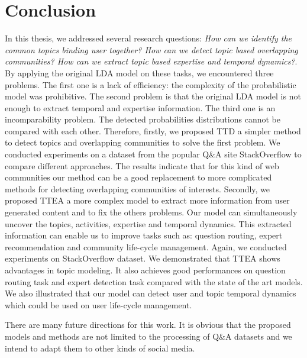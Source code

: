 \chapter{Conclusion}
\doublespacing
\label{chap:intro}
\minitoc



In this thesis, we addressed several research questions: \textit{How can we identify the common topics binding user together? How can we detect topic based overlapping communities? How can we extract topic based expertise and temporal dynamics?}. By applying the original  LDA model on these tasks, we encountered three problems. The first one is a lack of efficiency: the complexity of the probabilistic model was prohibitive. The second problem is that the original LDA model is not enough to extract temporal and expertise information. The third one is an incomparability problem. The detected probabilities distributions cannot be compared with each other. 
Therefore, firstly, we proposed TTD a simpler method to detect topics and overlapping communities to solve the first problem. We conducted experiments on a dataset from the popular Q\&A site StackOverflow to compare different approaches. The results indicate that for this kind of web communities our method can be a good replacement to more complicated methods for detecting overlapping communities of interests.
Secondly, we proposed TTEA a more complex model to extract more information from user generated content and to fix the others problems. Our model can simultaneously uncover the topics, activities, expertise and temporal dynamics. This extracted information can enable us to improve tasks such as: question routing, expert recommendation and community life-cycle management. Again, we conducted experiments on StackOverflow dataset. We demonstrated that TTEA shows advantages in topic modeling. It also achieves good performances on question routing task and expert detection task compared with the state of the art models. We also illustrated that our model can detect user and topic temporal dynamics which could be used on user life-cycle management.

There are many future directions for this work. It is obvious that the proposed models and methods are not limited to the processing of Q\&A datasets and we intend to adapt them to other kinds of social media.